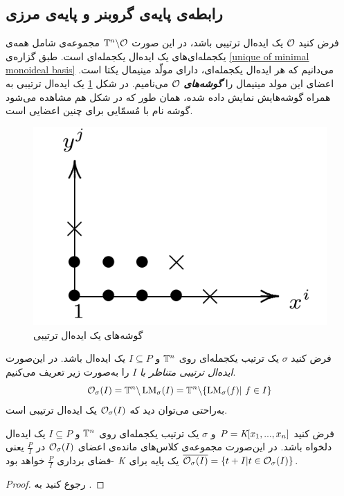 \subsection*{رابطه‌ی پایه‌ی گروبنر و پایه‌ی مرزی}

فرض کنید 
${\mathcal O}$
یک ایده‌ال ترتیبی باشد، در این صورت 
${\mathbb{T}}^{n}\backslash {\mathcal O}$
مجموعه‌ی شامل همه‌ی یکجمله‌ای‌های یک ایده‌ال یکجمله‌ای است. طبق  گزاره‌ی 
\ref{unique of minimal monoideal basis}
می‌دانیم که هر ایده‌ال یکجمله‌ای، دارای مولّد مینیمال یکتا است. اعضای این مولد مینیمال را 
\textbf{\textit{گوشه‌های}}
${\mathcal O}$
می‌نامیم. در شکل 
\ref{fig:corners}
یک ایده‌ال ترتیبی به همراه گوشه‌هایش نمایش داده شده، همان طور که در شکل هم مشاهده می‌شود گوشه نام با مُسمّایی برای چنین اعضایی است. 
\begin{figure}[H]
	\centering
	\includegraphics[width=0.4\linewidth]{Images/corners}
	\caption{گوشه‌های یک ایده‌ال ترتیبی}
	\label{fig:corners}
\end{figure}

\begin{definition}
	فرض کنید 
	$\sigma$
	یک ترتیب یکجمله‌ای روی 
	${\mathbb{T}}^{n}$
	و 
	$I\subseteq P$
	یک ایده‌ال باشد. در این‌صورت 
	\textit{ایده‌ال ترتیبی متناظر با }
	$I$
	را به‌صورت زیر تعریف می‌کنیم.
	$${\mathcal O}_{\sigma}(I) = {\mathbb{T}}^{n}\backslash\operatorname{\mathrm{LM}}_{\sigma}(I) = {\mathbb{T}}^{n}\backslash \{\operatorname{\mathrm{LM}}_{\sigma}(f)| \ f\in I\}$$
	به‌راحتی می‌توان دید که 
	${\mathcal O}_{\sigma}(I)$
	یک ایده‌ال ترتیبی است. 
\end{definition}

\begin{theorem}
	\label{macaulay basis th}
فرض کنید 
$P = \textit{K}[x_{1},...,x_{n}]$
و 
$\sigma$
یک ترتیب یکجمله‌ای روی 
${\mathbb{T}}^{n}$
و
$I\subseteq P$
یک ایده‌ال دلخواه باشد. در این‌صورت مجموعه‌ی کلاس‌های مانده‌ی اعضای 
${\mathcal O}_{\sigma}(I)$
در 
$\frac{P}{I}$
یعنی 
$\overline{{\mathcal O}_{\sigma}(I)} = \{t + I| t\in{\mathcal O}_{\sigma}(I)\}$
یک پایه‌ برای 
$\textit{K}$
-فضای برداری 
$\frac{P}{I}$
خواهد بود.
\end{theorem}
\begin{proof}
رجوع کنید به 
{\small \cite[ص.۶۲]{cca1_kreuzer}}.
\end{proof}

